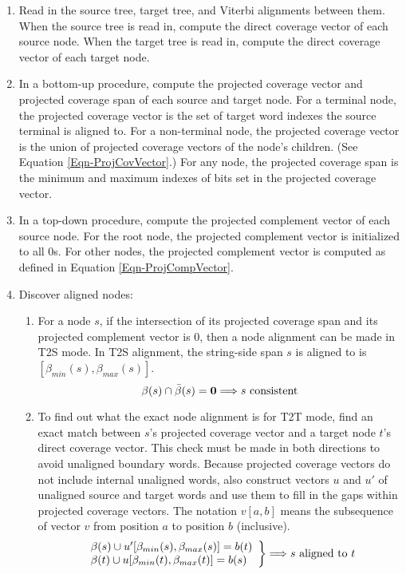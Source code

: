 \documentclass{article}
\begin{document}
\begin{enumerate}

\item Read in the source tree, target tree, and Viterbi alignments between them.  When the source tree is read in, compute the direct coverage vector of each source node.  When the target tree is read in, compute the direct coverage vector of each target node.

\item In a bottom-up procedure, compute the projected coverage vector and projected coverage span of each source and target node.  For a terminal node, the projected coverage vector is the set of target word indexes the source terminal is aligned to.  For a non-terminal node, the projected coverage vector is the union of projected coverage vectors of the node's children.  (See Equation \ref{Eqn-ProjCovVector}.)  For any node, the projected coverage span is the minimum and maximum indexes of bits set in the projected coverage vector.

\item In a top-down procedure, compute the projected complement vector of each source node.  For the root node, the projected complement vector is initialized to all 0s.  For other nodes, the projected complement vector is computed as defined in Equation \ref{Eqn-ProjCompVector}.

\item Discover aligned nodes:

    \begin{enumerate}

    \item For a node $s$, if the intersection of its projected coverage span and its projected complement vector is 0, then a node alignment can be made in T2S mode.  In T2S alignment, the string-side span $s$ is aligned to is $[\beta_{min}(s), \beta_{max}(s)]$.
    \begin{equation}
        \beta(s) \cap \bar{\beta}(s) = {\bf 0} \Longrightarrow s {\rm \ consistent}
    \end{equation}

    \item To find out what the exact node alignment is for T2T mode, find an exact match between $s$'s projected coverage vector and a target node $t$'s direct coverage vector.  This check must be made in both directions to avoid unaligned boundary words.  Because projected coverage vectors do not include internal unaligned words, also construct vectors $u$ and $u'$ of unaligned source and target words and use them to fill in the gaps within projected coverage vectors.  The notation $v[a, b]$ means the subsequence of vector $v$ from position $a$ to position $b$ (inclusive).
    \begin{equation}
        \left. \begin{array}{ll}
            \beta(s) \cup u'[\beta_{min}(s), \beta_{max}(s)]= b(t) \\
            \beta(t) \cup u[\beta_{min}(t), \beta_{max}(t)]= b(s)
        \end{array} \right\} \Longrightarrow s {\rm \ aligned\ to\ } t
    \end{equation}


\end{enumerate}
\end{enumerate}
\end{document}
